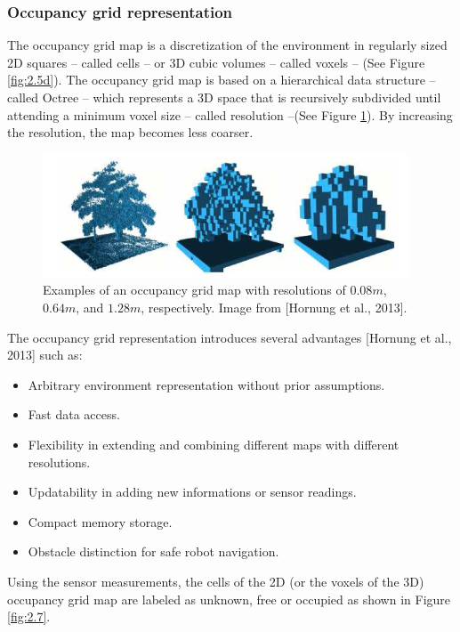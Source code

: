 \subsubsection{Occupancy grid representation}
The occupancy grid map is a discretization of the environment in regularly sized 2D squares – called cells – or 3D cubic volumes – called voxels – (See Figure \ref{fig:2.5d}). The occupancy grid map is based on a hierarchical data structure – called Octree – which represents a 3D space that is recursively subdivided until attending a minimum voxel size – called resolution –(See Figure \ref{fig:2.6}). By increasing the resolution, the map becomes less coarser.
\begin{figure}[H]
    \centering
    \includegraphics[width=\linewidth]{assets/2_6.png}
    \caption{Examples of an occupancy grid map with resolutions of $0.08m$, $0.64m$, and $1.28m$, respectively. Image from [Hornung et al., 2013].}
    \label{fig:2.6}
\end{figure}
The occupancy grid representation introduces several advantages [Hornung et al., 2013] such as:
\begin{itemize}
    \item Arbitrary environment representation without prior assumptions.
    \item Fast data access.
    \item Flexibility in extending and combining diﬀerent maps with diﬀerent resolutions.
    \item Updatability in adding new informations or sensor readings.
    \item Compact memory storage.
    \item Obstacle distinction for safe robot navigation.
\end{itemize}
Using the sensor measurements, the cells of the 2D (or the voxels of the 3D) occupancy grid map are labeled as unknown, free or occupied as shown in Figure \ref{fig:2.7}.
